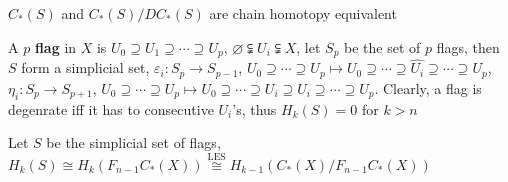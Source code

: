 \documentclass[../main.tex]{subfiles}
\begin{document}
\begin{theorem}
$C_*(S)$ and $C_*(S)/DC_*(S)$ are chain homotopy equivalent
\end{theorem}

\begin{definition}
A $p$ \textbf{flag} in $X$ is $U_0\supseteq U_1\supseteq\cdots\supseteq U_p$, $\varnothing\subsetneqq U_i\subsetneqq X$, let $S_p$ be the set of $p$ flags, then $S$ form a simplicial set, $\varepsilon_i:S_p\to S_{p-1}$, $U_0\supseteq\cdots\supseteq U_p\mapsto U_0\supseteq\cdots\supseteq \widehat{U_i}\supseteq\cdots\supseteq U_p$, $\eta_i:S_p\to S_{p+1}$, $U_0\supseteq\cdots\supseteq U_p\mapsto U_0\supseteq\cdots\supseteq U_i\supseteq U_i\supseteq\cdots\supseteq U_p$. Clearly, a flag is degenrate iff it has to consecutive $U_i$'s, thus $H_k(S)=0$ for $k>n$
\end{definition}

\begin{lemma}
Let $S$ be the simplicial set of flags, $H_k(S)\cong H_k(F_{n-1}C_*(X))\overset{\text{LES}}{\cong} H_{k-1}(C_*(X)/F_{n-1}C_*(X))$
\end{lemma}
\end{document}
